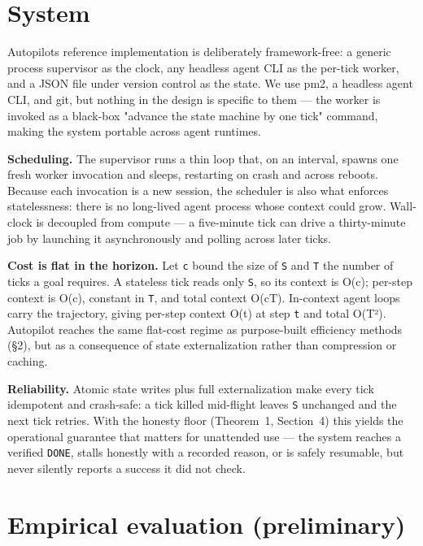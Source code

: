 \section{System}\label{system}

Autopilot\textquotesingle s reference implementation is deliberately framework-free: a generic process supervisor as
the clock, any headless agent CLI as the per-tick worker, and a JSON file under version control as the
state. We use pm2, a headless agent CLI, and git, but nothing in the design is specific to them --- the worker is
invoked as a black-box "advance the state machine by one tick" command, making the system portable
across agent runtimes.

\textbf{Scheduling.} The supervisor runs a thin loop that, on an interval, spawns one fresh worker
invocation and sleeps, restarting on crash and across reboots. Because each invocation is a new
session, the scheduler is also what enforces statelessness: there is no long-lived agent process whose
context could grow. Wall-clock is decoupled from compute --- a five-minute tick can drive a
thirty-minute job by launching it asynchronously and polling across later ticks.

\textbf{Cost is flat in the horizon.} Let \texttt{c} bound the size of \texttt{S} and \texttt{T} the number of ticks a goal
requires. A stateless tick reads only \texttt{S}, so its context is O(c); per-step context is O(c), constant
in \texttt{T}, and total context O(cT). In-context agent loops carry the trajectory, giving per-step context
O(t) at step \texttt{t} and total O(T²). Autopilot reaches the same flat-cost regime as purpose-built
efficiency methods (§2), but as a consequence of state externalization rather than compression or caching.

\textbf{Reliability.} Atomic state writes plus full externalization make every tick idempotent and
crash-safe: a tick killed mid-flight leaves \texttt{S} unchanged and the next tick retries. With the honesty
floor (Theorem~1, Section~4) this yields the operational guarantee that matters for unattended use --- the system reaches
a verified \texttt{DONE}, stalls honestly with a recorded reason, or is safely resumable, but never silently
reports a success it did not check.



\section{Empirical evaluation (preliminary)}\label{empirical-evaluation-preliminary}

